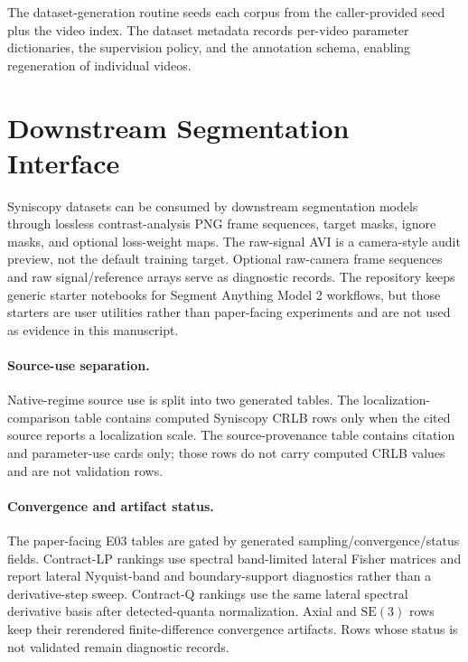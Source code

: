 The dataset-generation routine seeds each corpus from the caller-provided seed plus the video index. The dataset metadata records per-video parameter dictionaries, the supervision policy, and the annotation schema, enabling regeneration of individual videos.

\section{Downstream Segmentation Interface}
\label{sec:downstream-segmentation-interface}

Syniscopy datasets can be consumed by downstream segmentation models through lossless contrast-analysis PNG frame sequences, target masks, ignore masks, and optional loss-weight maps. The raw-signal AVI is a camera-style audit preview, not the default training target. Optional raw-camera frame sequences and raw signal/reference arrays serve as diagnostic records. The repository keeps generic starter notebooks for Segment Anything Model 2 workflows, but those starters are user utilities rather than paper-facing experiments and are not used as evidence in this manuscript.


\paragraph{Source-use separation.}
Native-regime source use is split into two generated tables. The localization-comparison table contains computed Syniscopy CRLB rows only when the cited source reports a localization scale. The source-provenance table contains citation and parameter-use cards only; those rows do not carry computed CRLB values and are not validation rows.



\paragraph{Convergence and artifact status.}
The paper-facing E03 tables are gated by generated sampling/convergence/status fields. Contract-LP rankings use spectral band-limited lateral Fisher matrices and report lateral Nyquist-band and boundary-support diagnostics rather than a derivative-step sweep. Contract-Q rankings use the same lateral spectral derivative basis after detected-quanta normalization. Axial and \(\mathrm{SE}(3)\) rows keep their rerendered finite-difference convergence artifacts. Rows whose status is not validated remain diagnostic records.
